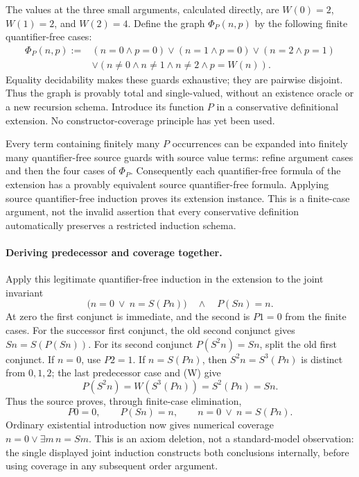 The values at the three small arguments, calculated directly, are
$W(0)=2$, $W(1)=2$, and $W(2)=4$. Define the graph $\Phi_P(n,p)$ by
the following finite quantifier-free cases:
\[
\begin{split}
\Phi_P(n,p):={}&(n=0\wedge p=0)\vee(n=1\wedge p=0)
 \vee(n=2\wedge p=1)\\
 &\vee(n\ne0\wedge n\ne1\wedge n\ne2\wedge p=W(n)).
\end{split}
\]
Equality decidability makes these guards exhaustive; they are pairwise
disjoint. Thus the graph is provably total and single-valued, without
an existence oracle or a new recursion schema. Introduce its function
$P$ in a conservative definitional extension. No constructor-coverage
principle has yet been used.

Every term containing finitely many $P$ occurrences can be expanded
into finitely many quantifier-free source guards with source value
terms: refine argument cases and then the four cases of $\Phi_P$.
Consequently each quantifier-free formula of the extension has a
provably equivalent source quantifier-free formula. Applying source
quantifier-free induction proves its extension instance. This is a
finite-case argument, not the invalid assertion that every conservative
definition automatically preserves a restricted induction schema.

\paragraph{Deriving predecessor and coverage together.}
Apply this legitimate quantifier-free induction in the extension to
the joint invariant
\[
 \bigl(n=0\ \lor\ n=S(Pn)\bigr)\quad\wedge\quad P(Sn)=n.
 \tag{Joint invariant}
\]
At zero the first conjunct is immediate, and the second is $P1=0$
from the finite cases. For the successor first conjunct, the old
second conjunct gives $Sn=S(P(Sn))$. For its second conjunct
$P(S^2n)=Sn$, split the old first conjunct. If $n=0$, use $P2=1$.
If $n=S(Pn)$, then $S^2n=S^3(Pn)$ is distinct from $0,1,2$;
the last predecessor case and (W) give
\[
 P(S^2n)=W(S^3(Pn))=S^2(Pn)=Sn.
\]
Thus the source proves, through finite-case elimination,
\[
 P0=0,\qquad P(Sn)=n,\qquad n=0\ \lor\ n=S(Pn).
\]
Ordinary existential introduction now gives numerical coverage
$n=0\lor\exists m\,n=Sm$. This is an axiom deletion, not a
standard-model observation: the single displayed joint induction
constructs both conclusions internally, before using coverage in
any subsequent order argument.

